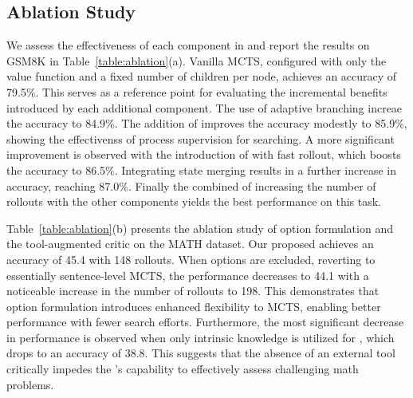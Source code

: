 

\subsection{Ablation Study}
% 

% 


We assess the effectiveness of each component in \model{} and report the results on GSM8K in Table~\ref{table:ablation}(a). Vanilla MCTS, configured with only the value function and a fixed number of children per node, achieves an accuracy of 79.5\%. This serves as a reference point for evaluating the incremental benefits introduced by each additional component. The use of adaptive branching increae the accuracy to 84.9\%. The addition of \prm{} improves the accuracy modestly to 85.9\%, showing the effectivenss of process supervision for searching. A more significant improvement is observed with the introduction of \orm{} with fast rollout, which boosts the accuracy to 86.5\%.  Integrating state merging results in a further increase in accuracy, reaching 87.0\%. Finally the combined of increasing the number of rollouts with the other components yields the best performance on this task. 

Table~\ref{table:ablation}(b) presents the ablation study of option formulation and the tool-augmented critic on the MATH dataset. Our proposed \emcts{} achieves an accuracy of 45.4 with 148 rollouts. When options are excluded, reverting to essentially sentence-level MCTS, the performance decreases to 44.1 with a noticeable increase in the number of rollouts to 198. This demonstrates that option formulation introduces enhanced flexibility to MCTS, enabling better performance with fewer search efforts. Furthermore, the most significant decrease in performance is observed when only intrinsic knowledge is utilized for \orm{}, which drops to an accuracy of 38.8. This suggests that the absence of an external tool critically impedes the \orm{}'s capability to effectively assess challenging math problems.


